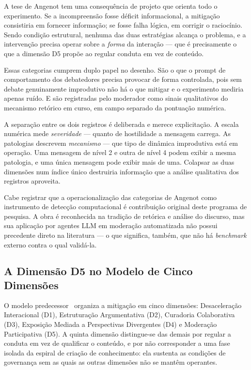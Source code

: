 \documentclass[conference]{IEEEtran} \IEEEoverridecommandlockouts %
\begin{document}
A tese de Angenot tem uma consequência de projeto que orienta todo o
experimento. Se a incompreensão fosse déficit informacional, a mitigação
consistiria em fornecer informação; se fosse falha lógica, em corrigir o
raciocínio. Sendo condição estrutural, nenhuma das duas estratégias alcança o
problema, e a intervenção precisa operar sobre a \textit{forma} da interação —
que é precisamente o que a dimensão D5 propõe ao regular conduta em vez de
conteúdo.

Essas categorias cumprem duplo papel no desenho. São o que o prompt de
comportamento dos debatedores precisa provocar de forma controlada, pois sem
debate genuinamente improdutivo não há o que mitigar e o experimento mediria
apenas ruído. E são registradas pelo moderador como sinais qualitativos do
mecanismo retórico em curso, em campo separado da pontuação numérica.

A separação entre os dois registros é deliberada e merece explicitação. A
escala numérica mede \textit{severidade} — quanto de hostilidade a mensagem
carrega. As patologias descrevem \textit{mecanismo} — que tipo de dinâmica
improdutiva está em operação. Uma mensagem de nível 2 e outra de nível 4 podem
exibir a mesma patologia, e uma única mensagem pode exibir mais de uma. Colapsar
as duas dimensões num índice único destruiria informação que a análise
qualitativa dos registros aproveita.

Cabe registrar que a operacionalização das categorias de Angenot como
instrumento de detecção computacional é contribuição original deste programa de
pesquisa. A obra é reconhecida na tradição de retórica e análise do discurso,
mas sua aplicação por agentes LLM em moderação automatizada não possui
precedente direto na literatura — o que significa, também, que não há
\textit{benchmark} externo contra o qual validá-la.

\subsection{A Dimensão D5 no Modelo de Cinco Dimensões}

O modelo predecessor~\cite{moura2026hostility} organiza a mitigação em cinco
dimensões: Desaceleração Interacional (D1), Estruturação Argumentativa (D2),
Curadoria Colaborativa (D3), Exposição Mediada a Perspectivas Divergentes (D4)
e Moderação Participativa (D5). A quinta dimensão distingue-se das demais por
regular a conduta em vez de qualificar o conteúdo, e por não corresponder a uma
fase isolada da espiral de criação de conhecimento: ela sustenta as condições
de governança sem as quais as outras dimensões não se mantêm operantes.
\end{document}
